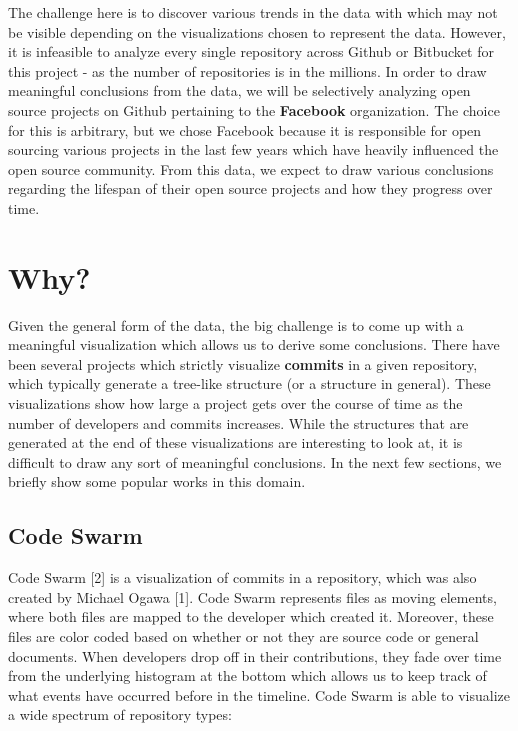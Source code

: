 \documentclass{article}
\begin{document}
The challenge here is to discover various trends in the data with which may not be visible depending on the visualizations chosen to represent the data. However, it is infeasible to analyze every single repository across Github or Bitbucket for this project - as the number of repositories is in the millions. In order to draw meaningful conclusions from the data, we will be selectively analyzing open source projects on Github pertaining to the \textbf{Facebook} organization. The choice for this is arbitrary, but we chose Facebook because it is responsible for open sourcing various projects in the last few years which have heavily influenced the open source community. From this data, we expect to draw various conclusions regarding the lifespan of their open source projects and how they progress over time.

\section {Why?}

Given the general form of the data, the big challenge is to come up with a meaningful visualization which allows us to derive some conclusions.  There have been several projects which strictly visualize \textbf{commits} in a given repository, which typically generate a tree-like structure (or a structure in general). These visualizations show how large a project gets over the course of time as the number of developers and commits increases. While the structures that are generated at the end of these visualizations are interesting to look at, it is difficult to draw any sort of meaningful conclusions. In the next few sections, we briefly show some popular works in this domain.

\subsection {Code Swarm}

Code Swarm [2] is a visualization of commits in a repository, which was also created by Michael Ogawa [1]. Code Swarm represents files as moving elements, where both files are mapped to the developer which created it. Moreover, these files are color coded based on whether or not they are source code or general documents. When developers drop off in their contributions, they fade over time from the underlying histogram at the bottom which allows us to keep track of what events have occurred before in the timeline. Code Swarm is able to visualize a wide spectrum of repository types: 
\end{document}

